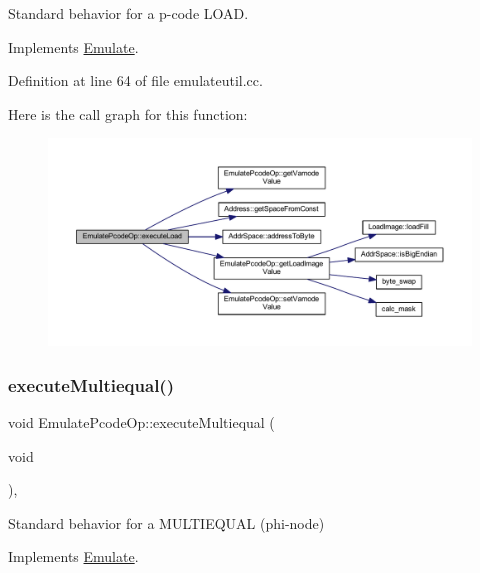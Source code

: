 Standard behavior for a p-\/code L\+O\+AD. 



Implements \mbox{\hyperlink{class_emulate_acc9c4d2ddbfe4ff639e320d30a212e56}{Emulate}}.



Definition at line 64 of file emulateutil.\+cc.

Here is the call graph for this function\+:
\nopagebreak
\begin{figure}[H]
\begin{center}
\leavevmode
\includegraphics[width=350pt]{class_emulate_pcode_op_ab665b04ab8db4b7025e1a5b6a05189ea_cgraph}
\end{center}
\end{figure}
\mbox{\label{class_emulate_pcode_op_a0d8951da9a7c253ad8bf4892fff9760a}} 
\subsubsection{\texorpdfstring{executeMultiequal()}{executeMultiequal()}}
{\footnotesize\ttfamily void Emulate\+Pcode\+Op\+::execute\+Multiequal (\begin{DoxyParamCaption}\item[{void}]{ }\end{DoxyParamCaption})\hspace{0.3cm}{\ttfamily [protected]}, {\ttfamily [virtual]}}



Standard behavior for a M\+U\+L\+T\+I\+E\+Q\+U\+AL (phi-\/node) 



Implements \mbox{\hyperlink{class_emulate_ab98cf68b6d37869f65825f3fdf03019c}{Emulate}}.




